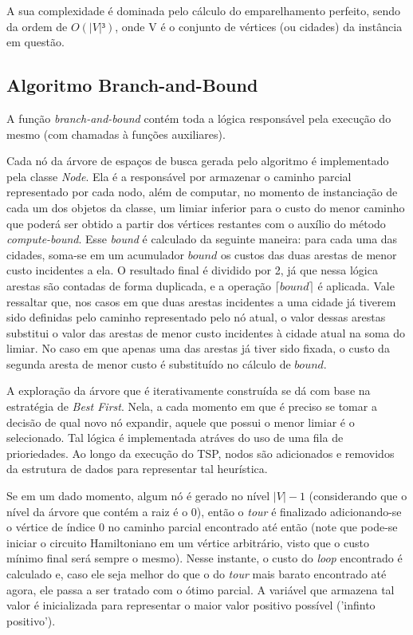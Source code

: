 \documentclass[12pt]{article}
\begin{document}
A sua complexidade é dominada pelo cálculo do emparelhamento perfeito, sendo da ordem de $O(|V|³)$, onde V é o conjunto de vértices (ou cidades) da instância em questão.

\subsection{Algoritmo Branch-and-Bound}

A função \textit{branch-and-bound} contém toda a lógica responsável pela execução do mesmo (com chamadas à funções auxiliares). 

Cada nó da árvore de espaços de busca gerada pelo algoritmo é implementado pela classe \textit{Node}. Ela é a responsável por armazenar o caminho parcial representado por cada nodo, além de computar, no momento de instanciação de cada um dos objetos da classe, um limiar inferior para o custo do menor caminho que poderá ser obtido a partir dos vértices restantes com o auxílio do método \textit{compute-bound}. Esse \textit{bound} é calculado da seguinte maneira: para cada uma das cidades, soma-se em um acumulador $bound$ os custos das duas arestas de menor custo incidentes a ela. O resultado final é dividido por 2, já que nessa lógica arestas são contadas de forma duplicada, e a operação $\lceil bound \rceil$ é aplicada. Vale ressaltar que, nos casos em que duas arestas incidentes a uma cidade já tiverem sido definidas pelo caminho representado pelo nó atual, o valor dessas arestas substitui o valor das arestas de menor custo incidentes à cidade atual na soma do limiar. No caso em que apenas uma das arestas já tiver sido fixada, o custo da segunda aresta de menor custo é substituído no cálculo de $bound$.

A exploração da árvore que é iterativamente construída se dá com base na estratégia de \textit{Best First}. Nela, a cada momento em que é preciso se tomar a decisão de qual novo nó expandir, aquele que possui o menor limiar é o selecionado. Tal lógica é implementada atráves do uso de uma fila de prioriedades. Ao longo da execução do TSP, nodos são adicionados e removidos da estrutura de dados para representar tal heurística.

Se em um dado momento, algum nó é gerado no nível $|V|-1$ (considerando que o nível da árvore que contém a raiz é o $0$), então o \textit{tour} é finalizado adicionando-se o vértice de índice 0 no caminho parcial encontrado até então (note que pode-se iniciar o circuito Hamiltoniano em um vértice arbitrário, visto que o custo mínimo final será sempre o mesmo). Nesse instante, o custo do \textit{loop} encontrado é calculado e, caso ele seja melhor do que o do \textit{tour} mais barato encontrado até agora, ele passa a ser tratado com o ótimo parcial. A variável que armazena tal valor é inicializada para representar o maior valor positivo possível ('infinto positivo').
\end{document}
